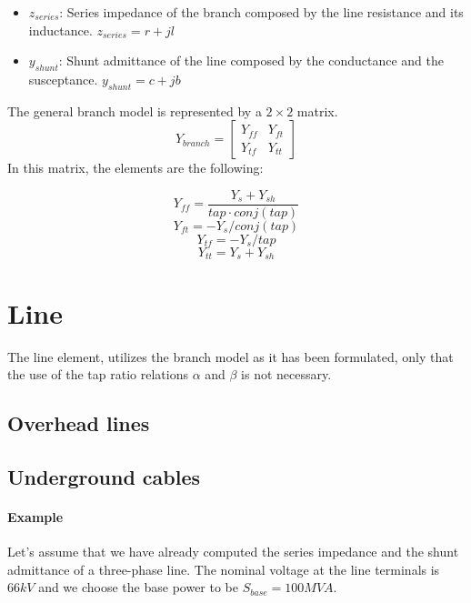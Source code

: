 \documentclass[nols,a4paper,twoside,notoc,fleqn]{tufte-book}
\begin{document}
\begin{itemize}
	\item $z_{series}$: Series impedance of the branch composed by the line resistance and its inductance. $z_{series}=r + jl$
	
	\item $y_{shunt}$: Shunt admittance of the line composed by the conductance and the susceptance. $y_{shunt}=c+jb$\newline
\end{itemize}



The general branch model is represented by a $2 \times 2$ matrix.
$$
Y_{branch}=\left[ \begin{array}{ccc}
Y_{ff} & Y_{ft} \\
Y_{tf} & Y_{tt} \end{array} \right]
$$
In this matrix, the elements are the following:


$$Y_{ff} = \frac{Y_s + Y_{sh}}{tap \cdot conj(tap)}  $$
$$Y_{ft} = - Y_s / conj(tap)$$
$$Y_{tf} = - Y_s / tap$$
$$Y_{tt} = Y_s + Y_{sh}$$



\section{Line}

The line element, utilizes the branch model as it has been formulated, only that the use of the tap ratio relations $\alpha$ and $\beta$ is not necessary.


\subsection{Overhead lines}


\subsection{Underground cables}


\paragraph{Example}

Let's assume that we have already computed the series impedance and the shunt admittance of a three-phase line. The nominal voltage at the line terminals is $66kV$ and we choose the base power to be $S_{base}=100MVA$.
\end{document}
